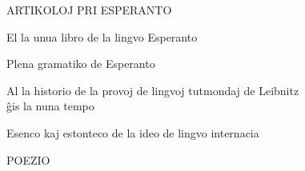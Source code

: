 {{\centering \sansfont ARTIKOLOJ PRI ESPERANTO\par}
\vspace{1em}

{ %

\setlength{\leftskip}{1em}
\setlength{\parindent}{-1em}
\setlength{\parskip}{0pt}

El la unua libro de la lingvo Esperanto \dotfill \pageref{unualibro}

Plena gramatiko de Esperanto  \dotfill \pageref{plena} 

Al la historio de la provoj de lingvoj tutmondaj de Leibnitz \\ ĝis la
  nuna tempo  \dotfill \pageref{leibnitz} 
  
Esenco kaj estonteco de la ideo de lingvo internacia  \dotfill \pageref{esenco} 

} %

{\centering \sansfont POEZIO\par}

}
